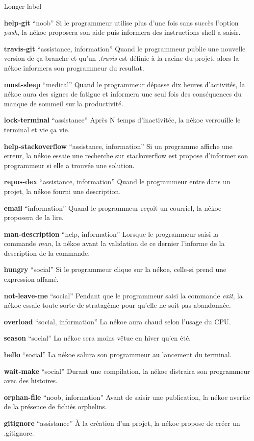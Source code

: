 \documentclass{report}
\begin{document}
\begin{labeling}{Longer label\quad}
    \item[\textbf{help-git} \enquote{noob}] Si le programmeur utilise plus d'une fois sans succès l'option \textit{push}, la nékoe proposera son aide puis informera des instructions shell a saisir.
	\item[\textbf{travis-git} \enquote{assistance, information}] Quand le programmeur publie une nouvelle version de ça branche et qu'un \textit{.travis} est définie à la racine du projet, alors la nékoe informera son programmeur du resultat.
    \item[\textbf{must-sleep} \enquote{medical}] Quand le programmeur dépasse dix heures d'activités, la nékoe aura des signes de fatigue et informera une seul fois des conséquences du manque de sommeil sur la productivité.
    \item[\textbf{lock-terminal} \enquote{assistance}] Après N temps d'inactivitée, la nékoe verrouille le terminal et vie ça vie.
	\item[\textbf{help-stackoverflow} \enquote{assistance, information}] Si un programme affiche une erreur, la nékoe essaie une recherche sur stackoverflow est propose d'informer son programmeur si elle a trouvée une solution.
	\item[\textbf{repos-dex} \enquote{assistance, information}] Quand le programmeur entre dans un projet, la nékoe fourni une description.
	\item[\textbf{email} \enquote{information}] Quand le programmeur reçoit un courriel, la nékoe proposera de la lire.
	\item[\textbf{man-description} \enquote{help, information}] Lorsque le programmeur saisi la commande \textit{man}, la nékoe avant la validation de ce dernier l'informe de la description de la commande.
	\item[\textbf{hungry} \enquote{social}] Si le programmeur clique sur la nékoe, celle-si prend une expression affamé.
	\item[\textbf{not-leave-me} \enquote{social}] Pendant que le programmeur saisi la commande \textit{exit}, la nékoe essaie toute sorte de stratagème pour qu'elle ne soit pas abandonnée.
	\item[\textbf{overload} \enquote{social, information}] La nékoe aura chaud selon l'usage du CPU.
	\item[\textbf{season} \enquote{social}] La nékoe sera moins vêtue en hiver qu'en été.
	\item[\textbf{hello} \enquote{social}] La nékoe salura son programmeur au lancement du terminal.
	\item[\textbf{wait-make} \enquote{social}] Durant une compilation, la nékoe distraira son programmeur avec des histoires.
	\item[\textbf{orphan-file} \enquote{noob, information}] Avant de saisir une publication, la nékoe avertie de la présence de fichiés orphelins.
	\item[\textbf{gitignore} \enquote{assistance}] À la création d'un projet, la nékoe propose de créer un .gitignore.
\end{labeling}
\end{document}
